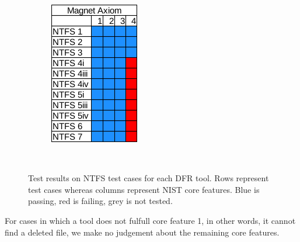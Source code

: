 \begin{figure}[h]
\begin{subfigure}{0.17\linewidth}
        \includegraphics[width=\linewidth]{fig/axiom_results_ntfs.png}
    \end{subfigure}~~
        
    \caption{Test results on NTFS test cases for each DFR tool. Rows represent test cases whereas columns represent NIST core features. Blue is passing, red is failing, grey is not tested.}
    \label{fig:results_ntfs}
\end{figure}

For cases in which a tool does not fulfull core feature 1, in other words, it cannot find a deleted file, we make no judgement about the remaining core features.

